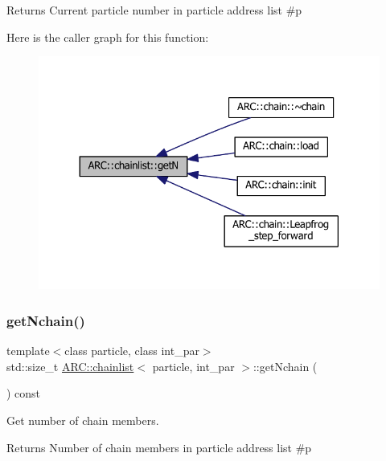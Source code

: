 \begin{DoxyReturn}{Returns}
Current particle number in particle address list \#p 
\end{DoxyReturn}
Here is the caller graph for this function\+:
\nopagebreak
\begin{figure}[H]
\begin{center}
\leavevmode
\includegraphics[width=330pt]{classARC_1_1chainlist_a2ed7858b13620c086e2e52b5b8d8020c_icgraph}
\end{center}
\end{figure}
\hypertarget{classARC_1_1chainlist_a1906d1caadfc424bbb6bd17a50affce9}{}\label{classARC_1_1chainlist_a1906d1caadfc424bbb6bd17a50affce9} 
\subsubsection{\texorpdfstring{get\+Nchain()}{getNchain()}}
{\footnotesize\ttfamily template$<$class particle, class int\+\_\+par$>$ \\
std\+::size\+\_\+t \hyperlink{classARC_1_1chainlist}{A\+R\+C\+::chainlist}$<$ particle, int\+\_\+par $>$\+::get\+Nchain (\begin{DoxyParamCaption}{ }\end{DoxyParamCaption}) const\hspace{0.3cm}{\ttfamily [inline]}}



Get number of chain members. 

\begin{DoxyReturn}{Returns}
Number of chain members in particle address list \#p 
\end{DoxyReturn}
\hypertarget{classARC_1_1chainlist_a60cec732dad13b91f7835fc0cd604e5f}{}\label{classARC_1_1chainlist_a60cec732dad13b91f7835fc0cd604e5f} 
